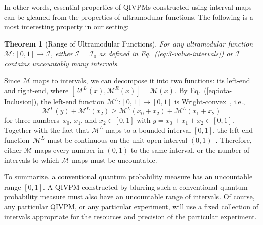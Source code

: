 \documentclass[english,reprint, aps, prl,superscriptaddress, showpacs,
showkeys, longbibliography, amsmath, amssymb, floatfix]{revtex4-1}
\theoremstyle{plain}
\newtheorem{thm}{Theorem}
\theoremstyle{definition}
\newcommand{\ultramodular}{\mathcal{M}}
\newcommand{\ultramodularL}[1][]{\ensuremath{\ultramodular^{L{#1}}}}
\newcommand{\ultramodularR}[1][]{\ensuremath{\ultramodular^{R{#1}}}}
\begin{document}
In other words, essential properties of QIVPMs constructed using
interval maps can be gleaned from the properties of
ultramodular functions. The following is a most interesting property
in our setting:

\begin{thm}[Range of Ultramodular Functions]\label{thm:convex-uncountable}For
any ultramodular function~$\ultramodular:\left[0,1\right]\rightarrow\mathscr{I}$,
either $\mathscr{I}=\mathscr{I}_{0}$ as defined in Eq.~(\ref{eq:3-value-intervals}) or
$\mathscr{I}$ contains uncountably many intervals.\end{thm}

Since $\ultramodular$ maps to intervals, we can decompose it into
two functions: its left-end and right-end, where
 $\left[\ultramodularL\left(x\right),\ultramodularR\left(x\right)\right]=\ultramodular\left(x\right)$.
By Eq.~(\ref{eq:iota-Inclusion}), the left-end function $\ultramodularL:\left[0,1\right]\rightarrow\left[0,1\right]$
is Wright-convex~\cite{Wright1954,RobertsVarberg1973,PecaricTong1992},
i.e., 
\[
\ultramodularL\left(y\right)+\ultramodularL\left(x_{2}\right)\ge\ultramodularL\left(x_{0}+x_{2}\right)+\ultramodularL\left(x_{1}+x_{2}\right)
\]
for three numbers~$x_{0}$, $x_{1}$, and $x_{2}\in\left[0,1\right]$ with
$y=x_{0}+x_{1}+x_{2}\in\left[0,1\right]$. 
Together with the fact that $\ultramodularL$ maps to a bounded
interval $\left[0,1\right]$, the left-end function~$\ultramodularL$
must be continuous on the unit open interval
$\left(0,1\right)$~\cite{MarinacciMontrucchio2005}.  Therefore,
either $\ultramodular$ maps every number in $\left(0,1\right)$ to the
same interval, or the number of intervals to which $\ultramodular$ maps
must be uncountable.

To summarize, a conventional quantum probability measure has an
uncountable range $[0,1]$. A QIVPM constructed by blurring such a
conventional quantum probability measure must also have an uncountable
range of intervals. Of course, any particular QIVPM, or any particular
experiment, will use a fixed collection of intervals appropriate for
the resources and precision of the particular experiment. 
\end{document}
